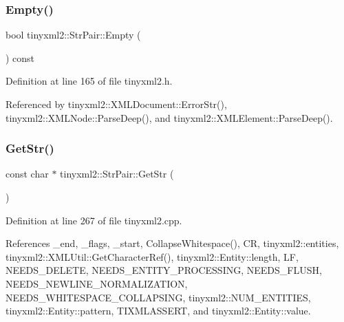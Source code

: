 \mbox{\label{classtinyxml2_1_1_str_pair_aca963a7eaa900bfddbea7312f040b39c}} 
\subsubsection{Empty()}
{\footnotesize\ttfamily bool tinyxml2\+::\+Str\+Pair\+::\+Empty (\begin{DoxyParamCaption}{ }\end{DoxyParamCaption}) const\hspace{0.3cm}{\ttfamily [inline]}}



Definition at line 165 of file tinyxml2.\+h.



Referenced by tinyxml2\+::\+X\+M\+L\+Document\+::\+Error\+Str(), tinyxml2\+::\+X\+M\+L\+Node\+::\+Parse\+Deep(), and tinyxml2\+::\+X\+M\+L\+Element\+::\+Parse\+Deep().

\mbox{\label{classtinyxml2_1_1_str_pair_ad87e3d11330f5e689ba1e7e54c023b57}} 
\subsubsection{GetStr()}
{\footnotesize\ttfamily const char $\ast$ tinyxml2\+::\+Str\+Pair\+::\+Get\+Str (\begin{DoxyParamCaption}{ }\end{DoxyParamCaption})}



Definition at line 267 of file tinyxml2.\+cpp.



References \+\_\+end, \+\_\+flags, \+\_\+start, Collapse\+Whitespace(), CR, tinyxml2\+::entities, tinyxml2\+::\+X\+M\+L\+Util\+::\+Get\+Character\+Ref(), tinyxml2\+::\+Entity\+::length, LF, N\+E\+E\+D\+S\+\_\+\+D\+E\+L\+E\+TE, N\+E\+E\+D\+S\+\_\+\+E\+N\+T\+I\+T\+Y\+\_\+\+P\+R\+O\+C\+E\+S\+S\+I\+NG, N\+E\+E\+D\+S\+\_\+\+F\+L\+U\+SH, N\+E\+E\+D\+S\+\_\+\+N\+E\+W\+L\+I\+N\+E\+\_\+\+N\+O\+R\+M\+A\+L\+I\+Z\+A\+T\+I\+ON, N\+E\+E\+D\+S\+\_\+\+W\+H\+I\+T\+E\+S\+P\+A\+C\+E\+\_\+\+C\+O\+L\+L\+A\+P\+S\+I\+NG, tinyxml2\+::\+N\+U\+M\+\_\+\+E\+N\+T\+I\+T\+I\+ES, tinyxml2\+::\+Entity\+::pattern, T\+I\+X\+M\+L\+A\+S\+S\+E\+RT, and tinyxml2\+::\+Entity\+::value.



